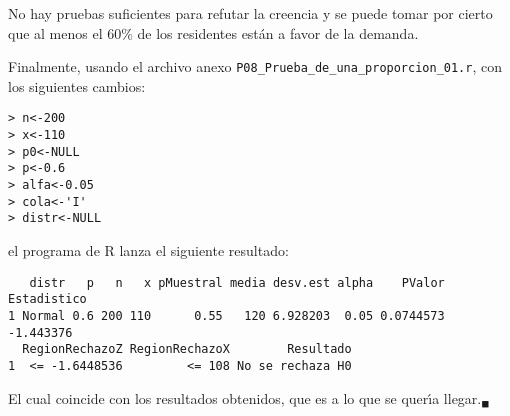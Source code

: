 \begin{solucion}
 \begin{conclusion}
  No hay pruebas suficientes para refutar la creencia y se puede tomar por cierto
  que al menos el $60\%$ de los residentes est\'an a favor de la demanda.
 \end{conclusion}
 Finalmente, usando el archivo anexo \texttt{P08\_Prueba\_de\_una\_proporcion\_01.r},
 con los siguientes cambios:
 \begin{verbatim}
> n<-200
> x<-110
> p0<-NULL
> p<-0.6
> alfa<-0.05
> cola<-'I'
> distr<-NULL
 \end{verbatim}
 \vspace{-0.5cm}
 el programa de R lanza el siguiente resultado:
 \begin{verbatim}
   distr   p   n   x pMuestral media desv.est alpha    PValor Estadistico
1 Normal 0.6 200 110      0.55   120 6.928203  0.05 0.0744573   -1.443376
  RegionRechazoZ RegionRechazoX        Resultado
1  <= -1.6448536         <= 108 No se rechaza H0
 \end{verbatim}
 \vspace{-0.5cm}
 El cual coincide con los resultados obtenidos,
 que es a lo que se quer\'{\i}a llegar.${}_{\blacksquare}$
\end{solucion}

